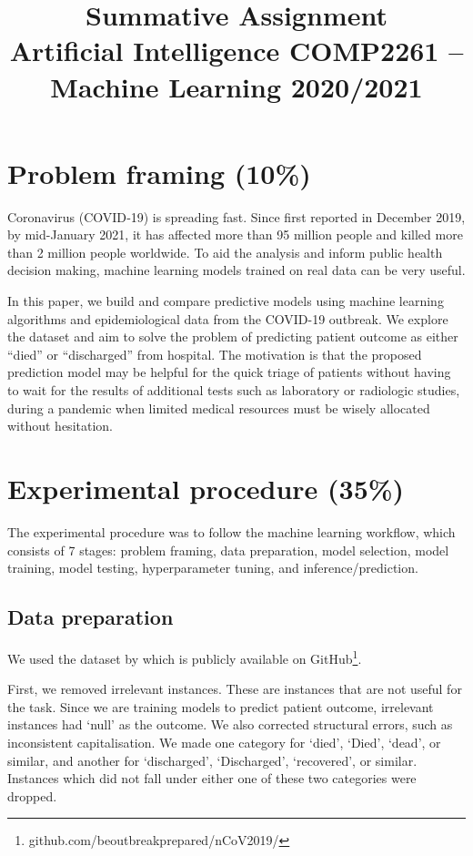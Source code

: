 \documentclass[twoside,11pt]{article}
\begin{document}
\title{Summative Assignment\\ 
Artificial Intelligence COMP2261 –\\
Machine Learning 2020/2021}

\maketitle

\section{Problem framing (10\%)}
Coronavirus (COVID‑19) is spreading fast. Since first reported in December 2019, by mid-January 2021, it has affected more than 95 million people and killed more than 2 million people worldwide. To aid the analysis and inform public health decision making, machine learning models trained on real data can be very useful.

In this paper, we build and compare predictive models using machine learning algorithms and epidemiological data from the COVID-19 outbreak. We explore the dataset and aim to solve the problem of predicting patient outcome as either “died” or “discharged” from hospital. The motivation is that the proposed prediction model may be helpful for the quick triage of patients without having to wait for the results of additional tests such as laboratory or radiologic studies, during a pandemic when limited medical resources must be wisely allocated without hesitation. 

\section{Experimental procedure (35\%)}
The experimental procedure was to follow the machine learning workflow, which consists of 7 stages: problem framing, data preparation, model selection, model training, model testing, hyperparameter tuning, and inference/prediction. 

\subsection{Data preparation}
We used the dataset by \cite{xu2020Epidemiological} which is publicly available on GitHub\footnote{github.com/beoutbreakprepared/nCoV2019/}.

First, we removed irrelevant instances. These are instances that are not useful for the task. Since we are training models to predict patient outcome, irrelevant instances had `null' as the outcome. We also corrected structural errors, such as inconsistent capitalisation. We made one category for `died', `Died', `dead', or similar, and another for `discharged', `Discharged', `recovered', or similar. Instances which did not fall under either one of these two categories were dropped. 
\end{document}
